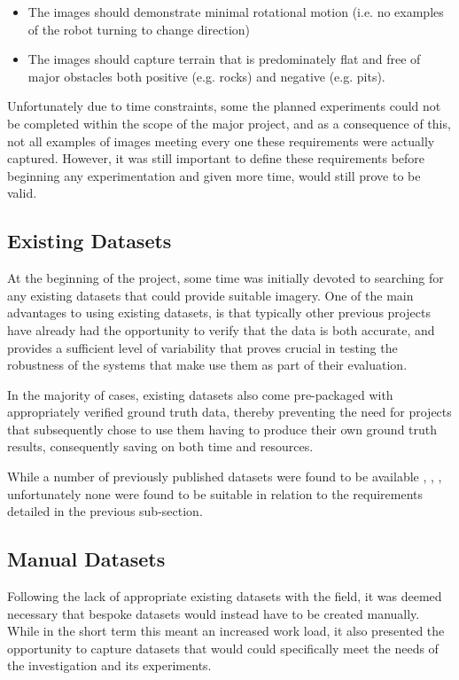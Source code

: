 \begin{itemize}
	\item The images should demonstrate minimal rotational motion (i.e. no examples of the robot turning to change direction)
	\item The images should capture terrain that is predominately flat and free of major obstacles both positive (e.g. rocks) and negative (e.g. pits).
\end{itemize}

Unfortunately due to time constraints, some the planned experiments could not be completed within the scope of the major project, and as a consequence of this, not all examples of images meeting every one these requirements were actually captured. However, it was still important to define these requirements before beginning any experimentation and given more time, would still prove to be valid.

\subsection{Existing Datasets}

At the beginning of the project, some time was initially devoted to searching for any existing datasets that could provide suitable imagery. One of the main advantages to using existing datasets, is that typically other previous projects have already had the opportunity to verify that the data is both accurate, and provides a sufficient level of variability that proves crucial in testing the robustness of the systems that make use them as part of their evaluation.

In the majority of cases, existing datasets also come pre-packaged with appropriately verified ground truth data, thereby preventing the need for projects that subsequently chose to use them having to produce their own ground truth results, consequently saving on both time and resources.

While a number of previously published datasets were found to be available \cite{ucl-dataset}, \cite{baker-dataset}, \cite{mpi-dataset}, unfortunately none were found to be suitable in relation to the requirements detailed in the previous sub-section.   

\subsection{Manual Datasets}

Following the lack of appropriate existing datasets with the field, it was deemed necessary that bespoke datasets would instead have to be created manually. While in the short term this meant an increased work load, it also presented the opportunity to capture datasets that would could specifically meet the needs of the investigation and its experiments.


